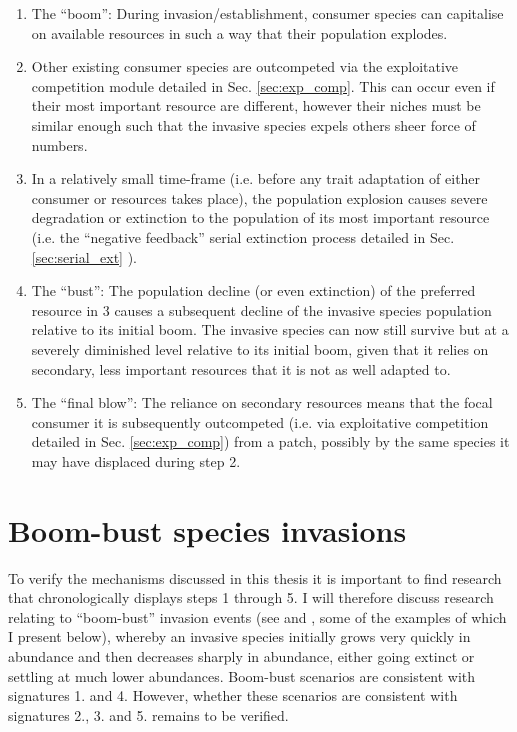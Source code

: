 \documentclass[a4paper]{report}
\begin{document}
\begin{enumerate}

\item The “boom”: During invasion/establishment, consumer species can capitalise on available resources in such a way that their population explodes.

\item Other existing consumer species are outcompeted via the exploitative competition module detailed in Sec. \ref{sec:exp_comp}. This can occur even if their most important resource are different, however their niches must be similar enough such that the invasive species expels others sheer force of numbers.

\item In a relatively small time-frame (i.e. before any trait adaptation of either consumer or resources takes place), the population explosion causes severe degradation or extinction to the population of its most important resource (i.e. the “negative feedback” serial extinction process detailed in Sec. \ref{sec:serial_ext} ).

\item The “bust”: The population decline (or even extinction) of the preferred resource in 3 causes a subsequent decline of the invasive species population relative to its initial boom. The invasive species can now still survive but at a severely diminished level relative to its initial boom, given that it relies on secondary, less important resources that it is not as well adapted to.

\item The “final blow”: The reliance on secondary resources means that the focal consumer it is subsequently outcompeted (i.e. via exploitative competition detailed in Sec. \ref{sec:exp_comp}) from a patch, possibly by the same species it may have displaced during step 2.

\end{enumerate}

\section{Boom-bust species invasions}

To verify the mechanisms discussed in this thesis it is important to find research that chronologically displays steps 1 through 5. I will therefore discuss research relating to “boom-bust” invasion events (see \citep{Strayer2017} and \citep{Simberloff2004}, some of the examples of which I present below), whereby an invasive species initially grows very quickly in abundance and then decreases sharply in abundance, either going extinct or settling at much lower abundances. Boom-bust scenarios are consistent with signatures 1. and  4. However, whether these scenarios are consistent with signatures 2., 3. and 5. remains to be verified. \\
\end{document}
